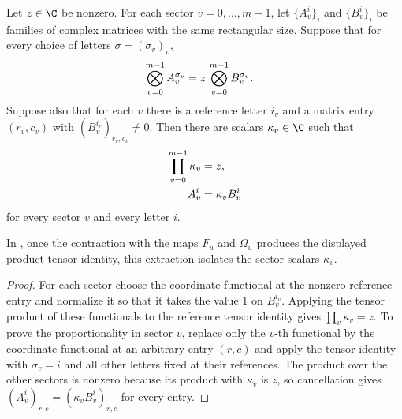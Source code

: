\begin{lemma}
    \label{thm:periodic_product_tensor_phase_extraction}
    \leanok
    Let $z\in\C$ be nonzero. For each sector $v=0,\ldots,m-1$, let
    $\{A_v^i\}_i$ and $\{B_v^i\}_i$ be families of complex matrices with the
    same rectangular size. Suppose that for every choice of letters
    $\sigma=(\sigma_v)_v$,
    \begin{align}
        \bigotimes_{v=0}^{m-1} A_v^{\sigma_v}
         & =
        z\,\bigotimes_{v=0}^{m-1} B_v^{\sigma_v}.
        \notag
    \end{align}
    Suppose also that for each $v$ there is a reference letter $i_v$ and a
    matrix entry $(r_v,c_v)$ with
    $(B_v^{i_v})_{r_v,c_v}\ne 0$. Then there are scalars
    $\kappa_v\in\C$ such that
    \begin{align}
        \prod_{v=0}^{m-1}\kappa_v & =z,
        \notag                                      \\
        A_v^i                     & =\kappa_v B_v^i
        \notag
    \end{align}
    for every sector $v$ and every letter $i$.

    In \cite[Appendix~A, lines~1072--1080]{DeLasCuevas2017Irreducible}, once the
    contraction with the maps $F_u$ and $\Omega_u$ produces the displayed
    product-tensor identity, this extraction isolates the sector scalars
    $\kappa_v$.
\end{lemma}

\begin{proof}\leanok
    For each sector choose the coordinate functional at the nonzero reference
    entry and normalize it so that it takes the value $1$ on
    $B_v^{i_v}$. Applying the tensor product of these functionals to the
    reference tensor identity gives $\prod_v\kappa_v=z$. To prove the
    proportionality in sector $v$, replace only the $v$-th functional by the
    coordinate functional at an arbitrary entry $(r,c)$ and apply the tensor
    identity with $\sigma_v=i$ and all other letters fixed at their references.
    The product over the other sectors is nonzero because its product with
    $\kappa_v$ is $z$, so cancellation gives
    $(A_v^i)_{r,c}=(\kappa_v B_v^i)_{r,c}$ for every entry.
\end{proof}

